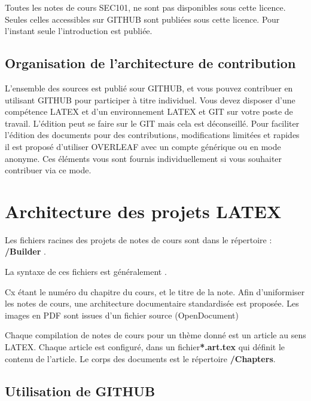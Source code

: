 Toutes les notes de cours SEC101, ne sont pas disponibles sous cette licence. Seules celles accessibles sur GITHUB sont publiées sous cette licence. Pour l'instant seule l'introduction est publiée.




\subsection{Organisation de l'architecture de contribution}

L'ensemble des sources est publié sour GITHUB, et vous pouvez contribuer en utilisant GITHUB pour participer à titre individuel. Vous devez disposer d'une compétence LATEX et d'un environnement LATEX et GIT sur votre poste de travail. L'édition peut se faire sur le GIT mais cela est déconseillé. Pour faciliter l'édition des documents pour des contributions, modifications limitées et rapides il est proposé d'utiliser OVERLEAF avec un compte générique ou en mode anonyme. Ces éléments vous sont fournis individuellement si vous souhaiter contribuer via ce mode.

\section{Architecture des projets LATEX}

\begin{frame}
	

Les fichiers racines des projets de notes de cours sont dans le répertoire : \textbf{/Builder} . 

La syntaxe de ces fichiers est généralement . 

Cx étant le numéro du chapitre du cours, et  le titre de la note.
Afin d'uniformiser les notes de cours, une architecture documentaire standardisée est proposée. 
Les images en PDF sont issues d'un fichier source (OpenDocument)

Chaque compilation de notes de cours pour un thème donné est un article au sens LATEX. Chaque article est configuré, dans un fichier\textbf{*.art.tex} qui définit le contenu de l'article. Le corps des documents est le répertoire \textbf{/Chapters}. 
\end{frame}

\subsection{Utilisation de GITHUB}

